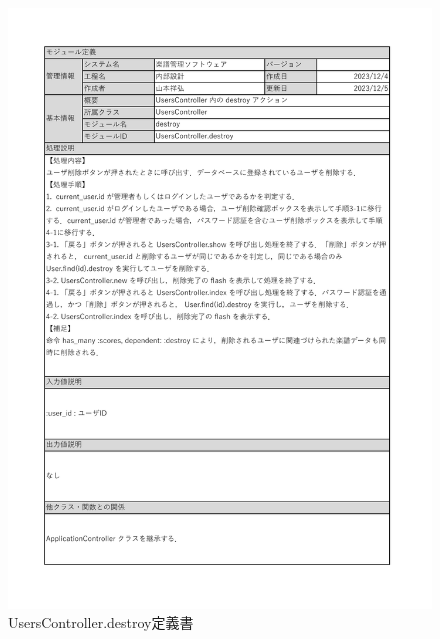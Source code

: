 \begin{figure}
    \centering
    \includegraphics[scale=0.7]{img/Users/xlsx/UsersController_destroy.pdf}
    \caption{UsersController.destroy定義書}
\end{figure}
